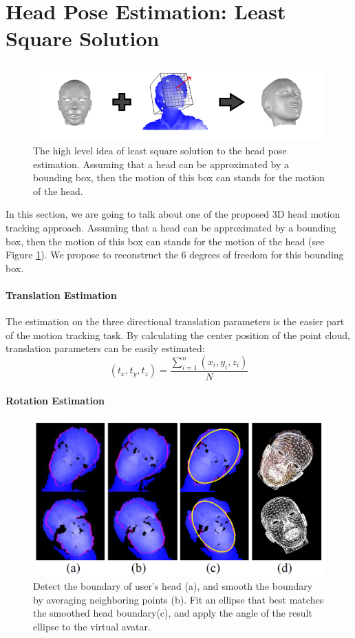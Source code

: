 \section{Head Pose Estimation: Least Square Solution}
\label{s:method1}
\begin{figure}
\includegraphics[width=1.0\linewidth]{./figure/M1_highlevel.png}
\caption{The high level idea of least square solution to the head pose estimation. Assuming that a head can be approximated by a bounding box, then the motion of this box can stands for the motion of the head.}
\label{f:m1_high}       %
\end{figure}
In this section, we are going to talk about one of the proposed 3D head motion tracking approach. Assuming that a head can be approximated by a bounding box, then the motion of this box can stands for the motion of the head (see Figure \ref{f:m1_high}). We propose to reconstruct the 6 degrees of freedom for this bounding box. 

\paragraph{Translation Estimation}
The estimation on the three directional translation parameters is the easier part of the motion tracking task. By calculating the center position of the point cloud, translation parameters can be easily estimated:
\begin{equation}
(t_{x},t_{y},t_{z})=\frac{\sum_{i=1}^n{(x_{i},y_{i},z_{i})}}{N}
\end{equation}

\paragraph{Rotation Estimation}
\begin{figure}
\centering
\includegraphics[width=0.7\linewidth]{./figure/ellipsefitting.png}
\caption{Detect the boundary of user’s head (a), and smooth the boundary by averaging neighboring points (b). Fit an ellipse that best matches the smoothed head boundary(c), and apply the angle of the result ellipse to the virtual avatar.}
\label{f:ellipse}       %
\end{figure}


